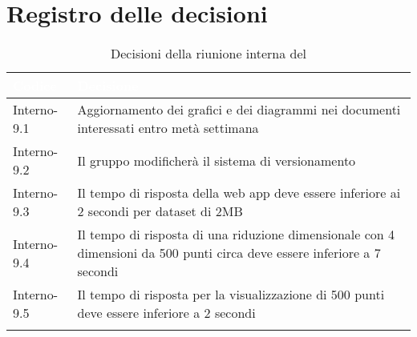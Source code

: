 \section{Registro delle decisioni}
{
\renewcommand{\arraystretch}{1.5}
\centering
\begin{longtable}{C{3cm} C{9cm}}
\textcolor{white}{\textbf{Codice}}&
\textcolor{white}{\textbf{Decisione}}\\	

\endhead
		
Interno-9.1 & Aggiornamento dei grafici e dei diagrammi nei documenti interessati entro metà settimana\\
Interno-9.2 & Il gruppo modificherà il sistema di versionamento\\
Interno-9.3 & Il tempo di risposta della web app deve essere inferiore ai 2 secondi per dataset di 2MB\\
Interno-9.4 & Il tempo di risposta di una riduzione dimensionale con 4 dimensioni da 500 punti circa deve essere inferiore a 7 secondi\\
Interno-9.5 & Il tempo di risposta per la visualizzazione di 500 punti deve essere inferiore a 2 secondi\\

\caption{Decisioni della riunione interna del \Data{}}
\end{longtable}
}

